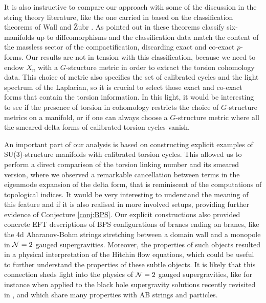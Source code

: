 \documentclass[11pt]{article}
\def\CN {{\cal N}}
\begin{document}
It is also instructive to compare our approach with some of the discussion in the string theory literature, like the one carried in \cite{Tomasiello:2005bp} based on the classification theorems of Wall \cite{WALL1966} and \v Zubr \cite{Zhubr1978ClassificationOS}. As pointed out in \cite{Tomasiello:2005bp} these theorems classify six-manifolds up to diffeomorphisms and the classification data match the content of the massless sector of the compactification, discarding exact and co-exact $p$-forms. Our results are not in tension with this classification, because we need to endow $X_n$ with a $G$-structure metric in order to extract the torsion cohomology data. This choice of metric also specifies the set of calibrated cycles and the light spectrum of the Laplacian, so it is crucial to select those exact and co-exact forms that contain the torsion information. In this light, it would be interesting to see if the presence of torsion in cohomology restricts the choice of $G$-structure metrics on a manifold, or if one can always choose a $G$-structure metric where all the smeared delta forms of calibrated torsion cycles vanish. 

An important part of our analysis is based on constructing explicit examples of SU(3)-structure manifolds with calibrated torsion cycles. This allowed us to perform a direct comparison of the torsion linking number and its smeared version, where we observed a remarkable cancellation between terms in the eigenmode expansion of the delta form, that is reminiscent of the computations of topological indices. It would be very interesting to understand the meaning of this feature and if it is also realised in more involved setups, providing further evidence of Conjecture \ref{conj:BPS}. Our explicit constructions also provided concrete EFT descriptions of BPS configurations of branes ending on branes, like the 4d Aharanov-Bohm strings stretching between a domain wall and a monopole in $\CN=2$ gauged supergravities. Moreover, the properties of such objects resulted in a physical interpretation of the Hitchin flow equations, which could be useful to further understand the properties of these subtle objects. It is likely that this connection sheds light into the physics of $\CN=2$ gauged supergravities, like for instance when applied to the black hole supergravity solutions recently revisited in \cite{Angius:2023xtu}, and which share many properties with AB strings and particles. 
\end{document}
